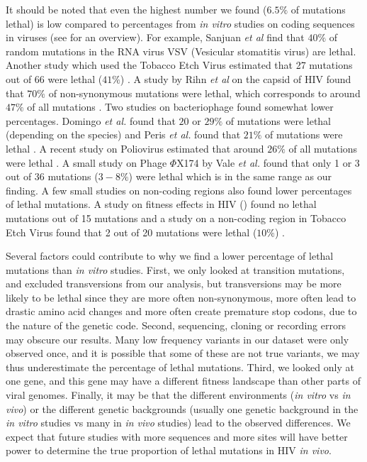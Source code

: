 \documentclass{article}
\begin{document}
It should be noted that even the highest number we found ($6.5\%$ of mutations lethal) is low compared to percentages from \textit {in vitro} studies on coding sequences in viruses (see \cite{sanjuan2010mutational} for an overview). 
For example, Sanjuan {\it et al} \cite{sanjuan2004distribution} find that $40\%$ of random mutations in the RNA virus VSV (Vesicular stomatitis virus) are lethal. 
Another study which used the Tobacco Etch Virus estimated that 27 mutations out of 66 were lethal ($41\%$) \cite{carrasco2007distribution}.
A study by Rihn 
\textit {et al} on the capsid of HIV found that $70\%$ of non-synonymous mutations were lethal, which corresponds to around $47\%$ of all mutations \cite{rihn2013extreme}. 
Two studies on bacteriophage found somewhat lower percentages. Domingo \textit {et al.} found that $20$ or $29\%$ of mutations were lethal (depending on the species) \cite{domingo2009fitness} and Peris \textit {et al.} found that $21\%$ of mutations were lethal \cite{peris2010distribution}.  
A recent study on Poliovirus estimated that around $26\%$ of all mutations were lethal \cite{acevedo2014mutational}.
A small study on Phage $\Phi$X174 by Vale \textit {et al.} \cite{vale2012distribution} found that only 1 or 3 out of 36 mutations ($3-8\%$) were lethal which is in the same range as our finding. A few small studies on non-coding regions also found lower percentages of lethal mutations. 
A study on fitness effects in HIV (\cite{van2006effects}) found no lethal mutations out of 15 mutations and a study on a non-coding region in Tobacco Etch Virus found that 2 out of 20 mutations were lethal ($10\%$) \cite{bernet2015distribution}. 

Several factors could contribute to why we find a lower percentage of lethal mutations than \textit {in vitro} studies.
First, we only looked at transition mutations, and excluded transversions from our analysis, but transversions may be more likely to be lethal since they are more often non-synonymous, more often lead to drastic amino acid changes and more often create premature stop codons, due to the nature of the genetic code. 
Second, sequencing, cloning or recording errors may obscure our results. Many low frequency variants in our dataset were only observed once, and it is possible that some of these are not true variants, we may thus underestimate the percentage of lethal mutations. Third, we looked only at one gene, and this gene may have a different fitness landscape than other parts of viral genomes. Finally, it may be that the different environments (\textit {in vitro} vs \textit {in vivo}) or the different genetic backgrounds (usually one genetic background in the \textit {in vitro} studies vs many in \textit {in vivo} studies) lead to the observed differences. We expect that future studies with more sequences and more sites will have better power to determine the true proportion of lethal mutations in HIV \textit {in vivo}. 
\end{document}

